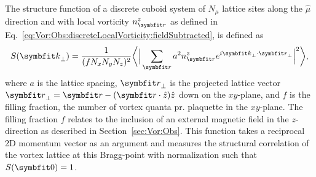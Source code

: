 The structure function of a discrete cuboid system of $N_\mu$ lattice sites along the $\hat{\mu}$ direction and with local vorticity $n^z_\v{r}$
as defined in Eq.~\eqref{eq:Vor:Obs:discreteLocalVorticity:fieldSubtracted}, is defined as 
\begin{equation}
    \label{eq:Vor:Symm:SF:def}
    S(\v{k}_\perp) = \frac{1}{(fN_xN_yN_z)^2}\bigg\langle\Big|\sum_\v{r}a^2n^z_\v{r}e^{i\v{k}_\perp\cdot\v{r}_\perp}\Big|^2\bigg\rangle,
\end{equation}
where $a$ is the lattice spacing, $\v{r}_\perp$ is the projected lattice vector $\v{r}_\perp = \v{r}-(\v{r}\cdot\hat{z})\hat{z}$ down on the $xy$-plane, and $f$ is the filling fraction, \ie the number
of vortex quanta pr. plaquette in the $xy$-plane. The filling fraction $f$ relates to the inclusion of an external magnetic field in the $z$-direction as described in Section~\ref{sec:Vor:Obs}.
This function takes a reciprocal 2D momentum vector as an argument and measures the structural correlation of the vortex lattice at this Bragg-point with normalization such that
$S(\v{0})=1$.

